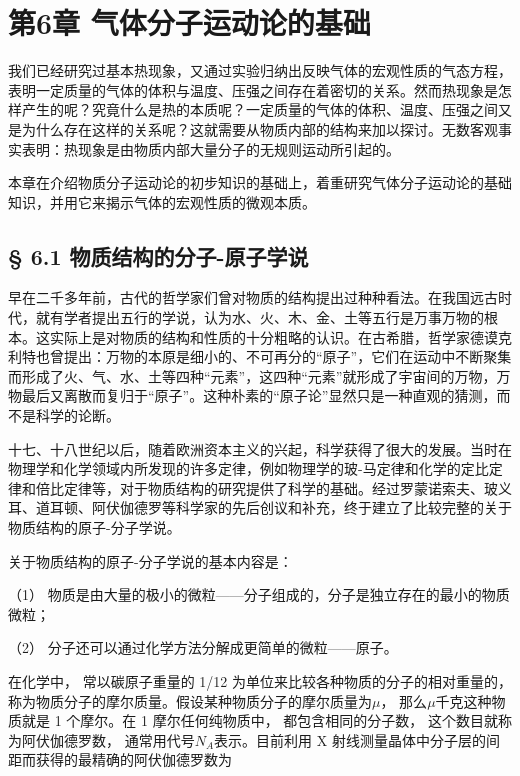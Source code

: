 \chapter{第6章
气体分子运动论的基础}\label{ux7b2c6ux7ae0-ux6c14ux4f53ux5206ux5b50ux8fd0ux52a8ux8bbaux7684ux57faux7840}

我们已经研究过基本热现象，又通过实验归纳出反映气体的宏观性质的气态方程，表明一定质量的气体的体积与温度、压强之间存在着密切的关系。然而热现象是怎样产生的呢？究竟什么是热的本质呢？一定质量的气体的体积、温度、压强之间又是为什么存在这样的关系呢？这就需要从物质内部的结构来加以探讨。无数客观事实表明：热现象是由物质内部大量分子的无规则运动所引起的。

本章在介绍物质分子运动论的初步知识的基础上，着重研究气体分子运动论的基础知识，并用它来揭示气体的宏观性质的微观本质。

\section{§ 6.1
物质结构的分子-原子学说}\label{ux7269ux8d28ux7ed3ux6784ux7684ux5206ux5b50-ux539fux5b50ux5b66ux8bf4}

早在二千多年前，古代的哲学家们曾对物质的结构提出过种种看法。在我国远古时代，就有学者提出五行的学说，认为水、火、木、金、土等五行是万事万物的根本。这实际上是对物质的结构和性质的十分粗略的认识。在古希腊，哲学家德谟克利特也曾提出：万物的本原是细小的、不可再分的``原子''，它们在运动中不断聚集而形成了火、气、水、土等四种``元素''，这四种``元素''就形成了宇宙间的万物，万物最后又离散而复归于``原子''。这种朴素的``原子论''显然只是一种直观的猜测，而不是科学的论断。

十七、十八世纪以后，随着欧洲资本主义的兴起，科学获得了很大的发展。当时在物理学和化学领域内所发现的许多定律，例如物理学的玻-马定律和化学的定比定律和倍比定律等，对于物质结构的研究提供了科学的基础。经过罗蒙诺索夫、玻义耳、道耳顿、阿伏伽德罗等科学家的先后创议和补充，终于建立了比较完整的关于物质结构的原子-分子学说。

关于物质结构的原子-分子学说的基本内容是：

（1）
物质是由大量的极小的微粒------分子组成的，分子是独立存在的最小的物质微粒；

（2） 分子还可以通过化学方法分解成更简单的微粒------原子。

在化学中， 常以碳原子重量的 1/12
为单位来比较各种物质的分子的相对重量的，
称为物质分子的摩尔质量。假设某种物质分子的摩尔质量为\(\mu\)，
那么\(\mu\)千克这种物质就是 1 个摩尔。在 1 摩尔任何纯物质中，
都包含相同的分子数， 这个数目就称为阿伏伽德罗数，
通常用代号\(N_{A}\)表示。目前利用 X
射线测量晶体中分子层的间距而获得的最精确的阿伏伽德罗数为

